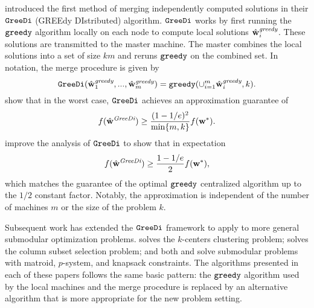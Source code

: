 \documentclass[thesis.tex]{subfiles}
\newcommand{\greedy}{\mkprocedure{greedy}}
\newcommand{\GreeDi}{\mkprocedure{GreeDi}}
\newcommand{\wgreedy}{\hat\w^\textit{greedy}}
\newcommand{\wGreeDi}{\hat\w^\textit{GreeDi}}
\begin{document}
\cite{mirzasoleiman2013distributed} introduced the first method of merging independently computed solutions in their $\GreeDi$ (GREEdy DIstributed) algorithm.
$\GreeDi$ works by first running the $\greedy$ algorithm locally on each node to compute local solutions $\wgreedy_i$.
These solutions are transmitted to the master machine.
The master combines the local solutions into a set of size $km$ and reruns $\greedy$ on the combined set.
In notation, the merge procedure is given by
\begin{equation}
    \GreeDi(\wgreedy_1,...,\wgreedy_m) = \greedy(\cup_{i=1}^m\wgreedy_i,k)
    .
\end{equation}
\cite{mirzasoleiman2013distributed} show that in the worst case,
$\GreeDi$ achieves an approximation guarantee of 
\begin{equation}
    f(\wGreeDi) \ge \frac{(1-1/e)^2}{\min\{m,k\}} f(\wstar)
    .
\end{equation}
\citet{barbosa2015power} improve the analysis of $\GreeDi$ to show that in expectation
\begin{equation}
    f(\wGreeDi) \ge \frac {1-1/e}{2} f(\wstar)
    ,
\end{equation}
which matches the guarantee of the optimal $\greedy$ centralized algorithm up to the $1/2$ constant factor.
Notably, the approximation is independent of the number of machines $m$ or the size of the problem $k$.

Subsequent work has extended the $\GreeDi$ framework to apply to more general submodular optimization problems.
\cite{malkomes2015fast} solves the $k$-centers clustering problem;
\cite{bhaskara2016greedy} solves the column subset selection problem;
and both \cite{barbosa2016new} and \citet{mirzasoleiman2016distributed} solve submodular problems with matroid, $p$-system, and knapsack constraints.
The algorithms presented in each of these papers follows the same basic pattern:
the $\greedy$ algorithm used by the local machines and the merge procedure is replaced by an alternative algorithm that is more appropriate for the new problem setting.
\end{document}
